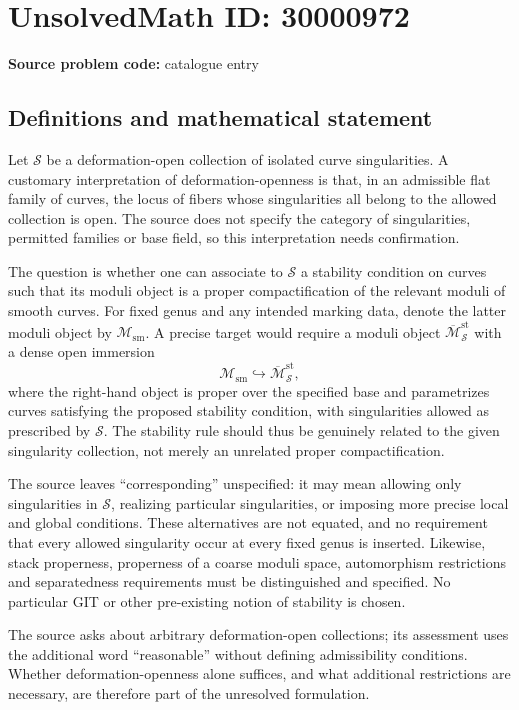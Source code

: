 \documentclass[11pt]{article}
\begin{document}
\section*{UnsolvedMath ID: 30000972}
\textbf{Source problem code:} catalogue entry
\subsection{Definitions and mathematical statement}
Let $\mathcal S$ be a deformation-open collection of isolated curve singularities. A customary interpretation of deformation-openness is that, in an admissible flat family of curves, the locus of fibers whose singularities all belong to the allowed collection is open. The source does not specify the category of singularities, permitted families or base field, so this interpretation needs confirmation.

The question is whether one can associate to $\mathcal S$ a stability condition on curves such that its moduli object is a proper compactification of the relevant moduli of smooth curves. For fixed genus and any intended marking data, denote the latter moduli object by $\mathcal M_{\mathrm{sm}}$. A precise target would require a moduli object $\overline{\mathcal M}_{\mathcal S}^{\mathrm{st}}$ with a dense open immersion
\[
\mathcal M_{\mathrm{sm}}\hookrightarrow\overline{\mathcal M}_{\mathcal S}^{\mathrm{st}},
\]
where the right-hand object is proper over the specified base and parametrizes curves satisfying the proposed stability condition, with singularities allowed as prescribed by $\mathcal S$. The stability rule should thus be genuinely related to the given singularity collection, not merely an unrelated proper compactification.

The source leaves ``corresponding'' unspecified: it may mean allowing only singularities in $\mathcal S$, realizing particular singularities, or imposing more precise local and global conditions. These alternatives are not equated, and no requirement that every allowed singularity occur at every fixed genus is inserted. Likewise, stack properness, properness of a coarse moduli space, automorphism restrictions and separatedness requirements must be distinguished and specified. No particular GIT or other pre-existing notion of stability is chosen.

The source asks about arbitrary deformation-open collections; its assessment uses the additional word ``reasonable'' without defining admissibility conditions. Whether deformation-openness alone suffices, and what additional restrictions are necessary, are therefore part of the unresolved formulation.
\end{document}
